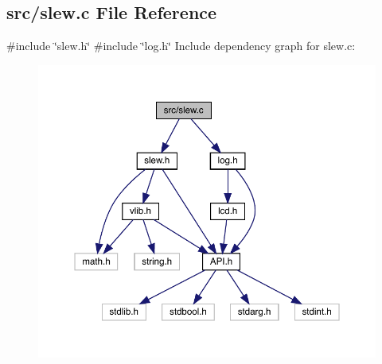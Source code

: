 \subsection{src/slew.c File Reference}
\label{slew_8c}
{\ttfamily \#include \char`\"{}slew.\+h\char`\"{}}\newline
{\ttfamily \#include \char`\"{}log.\+h\char`\"{}}\newline
Include dependency graph for slew.\+c\+:\nopagebreak
\begin{figure}[H]
\begin{center}
\leavevmode
\includegraphics[width=350pt]{slew_8c__incl}
\end{center}
\end{figure}
